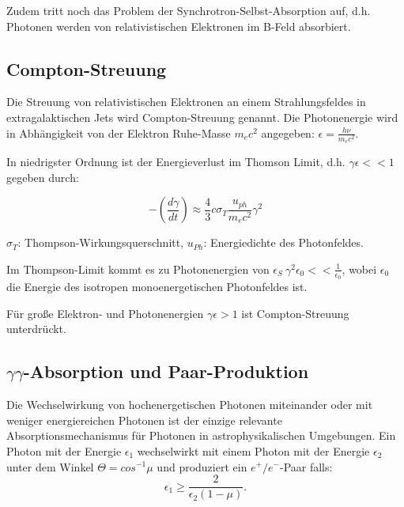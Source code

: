 Zudem tritt noch das Problem der Synchrotron-Selbst-Absorption auf, d.h. Photonen werden von relativistischen Elektronen im B-Feld absorbiert.\cite{RelativisticJets}

\subsection{Compton-Streuung}
Die Streuung von relativistischen Elektronen an einem Strahlungsfeldes in extragalaktischen Jets wird Compton-Streuung genannt.
Die Photonenergie wird in Abhängigkeit von der Elektron Ruhe-Masse $m_e c^2$ angegeben: $\epsilon= \frac{h\nu}{m_e c^2}$.\cite{RelativisticJets}
 
In niedrigster Ordnung ist der Energieverlust im Thomson Limit, d.h. $\gamma \epsilon <<1$ gegeben durch:

\begin{equation}
-\left(\frac{d\gamma}{dt} \right) \approx \frac{4}{3} c \sigma_T \frac{u_{ph}}{m_e c^2} \gamma^2
\end{equation}

\begin{center}
 \begin{tiny}
  $\sigma_T$: Thompson-Wirkungsquerschnitt, $u_{Ph}$: Energiedichte des Photonfeldes.
 \end{tiny}
\end{center}

Im Thompson-Limit kommt es zu Photonenergien von $\epsilon_S ~\gamma^2 \epsilon_0 << \frac{1}{\epsilon_0} $, wobei $\epsilon_0$ die Energie des isotropen monoenergetischen Photonfeldes ist.\cite{RelativisticJets}

Für große Elektron- und Photonenergien $\gamma \epsilon > 1$ ist Compton-Streuung unterdrückt.\cite{RelativisticJets}


\subsection{$\gamma\gamma$-Absorption und Paar-Produktion}
Die Wechselwirkung von hochenergetischen Photonen miteinander oder mit weniger energiereichen Photonen ist der einzige relevante Absorptionsmechanismus für Photonen in astrophysikalischen Umgebungen.
Ein Photon mit der Energie $\epsilon_1$ wechselwirkt mit einem Photon mit der Energie $\epsilon_2$ unter dem Winkel $\Theta=cos^{-1}\mu$ und produziert ein $e^+/e^-$-Paar falls:
\begin{equation}
 \epsilon_1 \geq \frac{2}{\epsilon_2 (1-\mu)}.
\end{equation}


